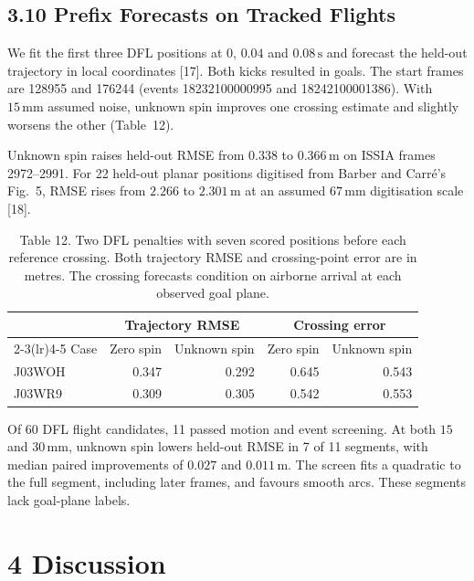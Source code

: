 \subsection{3.10 Prefix Forecasts on Tracked Flights}

We fit the first three DFL positions at $0$, $0.04$ and $0.08\,\mathrm{s}$ and forecast the held-out trajectory in local coordinates [17]. Both kicks resulted in goals. The start frames are 128955 and 176244 (events 18232100000995 and 18242100001386). With $15\,\mathrm{mm}$ assumed noise, unknown spin improves one crossing estimate and slightly worsens the other (Table~12).

Unknown spin raises held-out RMSE from $0.338$ to $0.366\,\mathrm{m}$ on ISSIA frames 2972--2991. For 22 held-out planar positions digitised from Barber and Carr\'e's Fig.~5, RMSE rises from $2.266$ to $2.301\,\mathrm{m}$ at an assumed $67\,\mathrm{mm}$ digitisation scale [18].

\begin{table}[htbp]
  
  \caption{Table 12. Two DFL penalties with seven scored positions before each reference crossing. Both trajectory RMSE and crossing-point error are in metres. The crossing forecasts condition on airborne arrival at each observed goal plane.}
  \begin{tabular}{lrrrr}
    \toprule
    & \multicolumn{2}{c}{Trajectory RMSE} & \multicolumn{2}{c}{Crossing error} \\
    \cmidrule(lr){2-3}\cmidrule(lr){4-5}
    Case & Zero spin & Unknown spin & Zero spin & Unknown spin \\
    \midrule
    J03WOH & 0.347 & 0.292 & 0.645 & 0.543 \\
    J03WR9 & 0.309 & 0.305 & 0.542 & 0.553 \\
    \bottomrule
  \end{tabular}
\end{table}

Of 60 DFL flight candidates, 11 passed motion and event screening. At both $15$ and $30\,\mathrm{mm}$, unknown spin lowers held-out RMSE in 7 of 11 segments, with median paired improvements of $0.027$ and $0.011\,\mathrm{m}$. The screen fits a quadratic to the full segment, including later frames, and favours smooth arcs. These segments lack goal-plane labels.

\section{4 Discussion}

